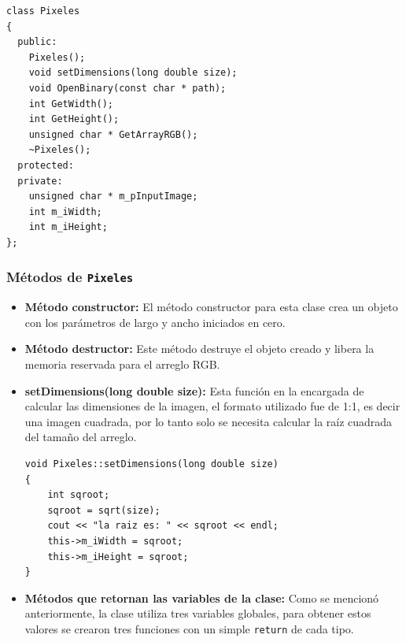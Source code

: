 \begin{verbatim}
class Pixeles
{
  public:
    Pixeles();
	void setDimensions(long double size);
    void OpenBinary(const char * path);
    int GetWidth();
    int GetHeight();
    unsigned char * GetArrayRGB();
    ~Pixeles();
  protected:
  private:
    unsigned char * m_pInputImage;
    int m_iWidth;
    int m_iHeight;
};
\end{verbatim}

\subsubsection{Métodos de \texttt{Pixeles}}
\begin{itemize}
    \item \textbf{Método constructor:} El método constructor para esta clase crea un objeto con los parámetros de largo y ancho iniciados en cero.
    \item \textbf{Método destructor:} Este método destruye el objeto creado y libera la memoria reservada para el arreglo RGB.
    \item \textbf{setDimensions(long double size):} Esta función en la encargada de calcular las dimensiones de la imagen, el formato utilizado fue de 1:1, es decir una imagen cuadrada, por lo tanto solo se necesita calcular la raíz cuadrada del tamaño del arreglo.
    
    \begin{verbatim}
void Pixeles::setDimensions(long double size)
{
	int sqroot;
	sqroot = sqrt(size);
	cout << "la raiz es: " << sqroot << endl;
    this->m_iWidth = sqroot;
    this->m_iHeight = sqroot;
}
\end{verbatim}

    \item \textbf{Métodos que retornan las variables de la clase:} Como se mencionó anteriormente, la clase utiliza tres variables globales, para obtener estos valores se crearon tres funciones con un simple \texttt{return} de cada tipo.
    

\end{itemize}
